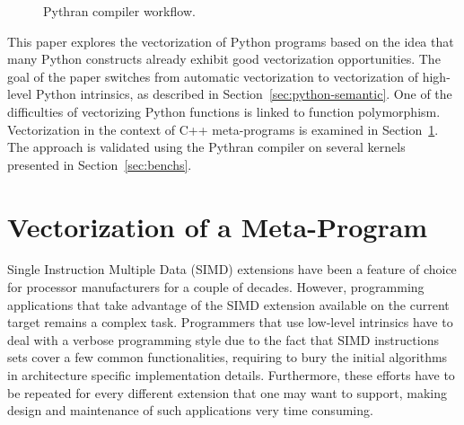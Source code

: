 \documentclass[preprint]{sigplanconf}
\begin{document}
\begin{figure}

\centering
{}

\caption{Pythran compiler workflow.}
\label{fig:pythran-compiler}
\end{figure}


This paper explores the vectorization of Python programs based on the idea that
many Python constructs already exhibit good vectorization opportunities. The
goal of the paper switches from automatic vectorization to vectorization of
high-level Python intrinsics, as described in Section~\ref{sec:python-semantic}.
One of the difficulties of vectorizing Python functions is linked to function
polymorphism. Vectorization in the context of C++ meta-programs is examined in
Section~\ref{sec:meta-vectorization}. The approach is validated using the
Pythran compiler on several kernels presented in Section~\ref{sec:benchs}.

\section{Vectorization of a Meta-Program}
\label{sec:meta-vectorization}

Single Instruction Multiple Data (SIMD) extensions have been a feature of
choice for processor manufacturers for a couple of decades. However,
programming applications that take advantage of the SIMD extension available on
the current target remains a complex task. Programmers that use low-level
intrinsics have to deal with a verbose programming style due to the fact that
SIMD instructions sets cover a few common functionalities, requiring to bury
the initial algorithms in architecture specific implementation details.
Furthermore, these efforts have to be repeated for every different extension
that one may want to support, making design and maintenance of such
applications very time consuming. 
\end{document}
